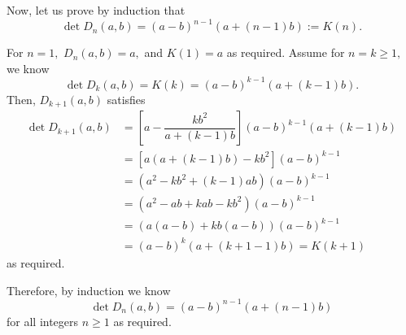 \documentclass[12pt]{article}
\begin{document}
\begin{enumerate}
    Now, let us prove by induction that $$
    \det D_n(a, b) = (a-b)^{n-1}(a + (n-1)b) := K(n).
    $$

    For $n = 1,$ $D_n(a, b) = a,$ and $K(1) = a$ as required. Assume
    for $n = k \geq 1,$ we know $$
    \det D_k(a, b) = K(k) = (a-b)^{k-1}(a + (k-1)b).
    $$
    Then, $D_{k + 1}(a, b)$ satisfies
    \begin{align*}
      \det D_{k+1}(a, b) &= \left[a - \dfrac{kb^2}{a + (k-1)b}
      \right] (a-b)^{k-1} (a + (k-1)b) \\
      &=\left[a(a + (k -1)b) - kb^2\right] (a-b)^{k-1} \\
      &= (a^2 - kb^2 + (k-1)ab) (a-b)^{k-1} \\
      &= (a^2 - ab + kab - kb^2) (a-b)^{k-1} \\
      &= (a(a- b) + kb(a - b)) (a-b)^{k-1} \\
      &= (a-b)^k (a + (k + 1 -1)b) = K(k + 1)
    \end{align*}
    as required.

    Therefore, by induction we know
    $$
    \det D_n(a, b) = (a-b)^{n-1} (a + (n - 1)b)
    $$
    for all integers $n \geq 1$ as required.
\end{enumerate}
\end{document}
